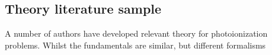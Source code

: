 \subsection{Theory literature sample\label{sec:theory-lit}}

A number of authors have developed relevant theory for photoionization problems. Whilst the fundamentals are similar, but different formalisms 